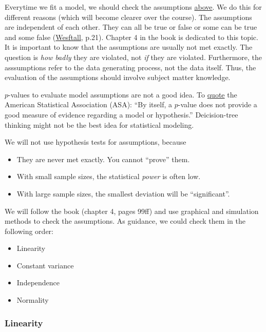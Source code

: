 \documentclass[
]{book}
\providecommand{\tightlist}{%
  \setlength{\itemsep}{0pt}\setlength{\parskip}{0pt}}
\begin{document}
Everytime we fit a model, we should check the assumptions \hyperref[_model_assumptions]{above}.
We do this for different reasons (which will become clearer over the course).
The assumptions are independent of each other.
They can all be true or false or some can be true and some false
(\href{https://www.routledge.com/Understanding-Regression-Analysis-A-Conditional-Distribution-Approach/Westfall-Arias/p/book/9780367493516?srsltid=AfmBOore3O_Ciecl0TTkr9AjPIY1d6OmbQa7o7IAdKpTSkD8s9HkwzD4}{Wesftall}, p.21).
Chapter 4 in the book is dedicated to this topic. It is important to know
that the assumptions are usually not met exactly. The question is \emph{how badly} they are violated,
not \emph{if} they are violated.
Furthermore, the asssumptions refer to the data generating process, not the data itself.
Thus, the evaluation of the assumptions should involve subject matter knowledge.

\(p\)-values to evaluate model assumptions are not a good idea. To \href{https://www.tandfonline.com/doi/full/10.1080/00031305.2016.1154108\#d1e949}{quote} the
American Statistical Association (ASA): ``By itself, a \(p\)-value does not provide a good measure
of evidence regarding a model or hypothesis.''
Deicision-tree thinking might not be the best idea for statistical modeling.

We will not use hypothesis tests for assumptions, because

\begin{itemize}
\tightlist
\item
  They are never met exactly. You cannot ``prove'' them.
\item
  With small sample sizes, the statistical \emph{power} is often low.
\item
  With large sample sizes, the smallest deviation will be ``significant''.
\end{itemize}

We will follow the book (chapter 4, pages 99ff) and use graphical and simulation methods to check the assumptions.
As guidance, we could check them in the following order:

\begin{itemize}
\tightlist
\item
  Linearity
\item
  Constant variance
\item
  Independence
\item
  Normality
\end{itemize}

\subsubsection{Linearity}\label{linearity}
\end{document}
